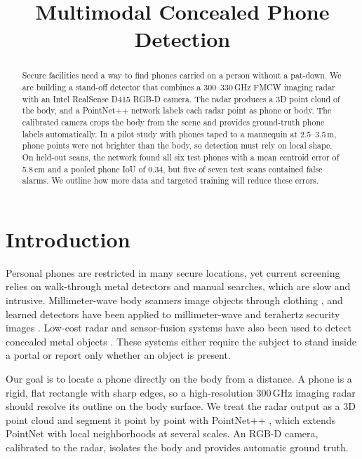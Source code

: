 \documentclass[conference]{IEEEtran}
\begin{document}
\title{Multimodal Concealed Phone Detection}

\author{
}

\maketitle

\begin{abstract}
Secure facilities need a way to find phones carried on a person without a pat-down. We are building a stand-off detector that combines a 300--330\,GHz FMCW imaging radar with an Intel RealSense D415 RGB-D camera. The radar produces a 3D point cloud of the body, and a PointNet++ network labels each radar point as phone or body. The calibrated camera crops the body from the scene and provides ground-truth phone labels automatically. In a pilot study with phones taped to a mannequin at 2.5--3.5\,m, phone points were not brighter than the body, so detection must rely on local shape. On held-out scans, the network found all six test phones with a mean centroid error of 5.8\,cm and a pooled phone IoU of 0.34, but five of seven test scans contained false alarms. We outline how more data and targeted training will reduce these errors.
\end{abstract}

\section{Introduction}
Personal phones are restricted in many secure locations, yet current screening relies on walk-through metal detectors and manual searches, which are slow and intrusive. Millimeter-wave body scanners image objects through clothing \cite{sheen2001}, and learned detectors have been applied to millimeter-wave and terahertz security images \cite{meng2020,pang2020}. Low-cost radar and sensor-fusion systems have also been used to detect concealed metal objects \cite{mitchell2023,kaul2024}. These systems either require the subject to stand inside a portal or report only whether an object is present.

Our goal is to locate a phone directly on the body from a distance. A phone is a rigid, flat rectangle with sharp edges, so a high-resolution 300\,GHz imaging radar should resolve its outline on the body surface. We treat the radar output as a 3D point cloud and segment it point by point with PointNet++ \cite{qi2017pointnetpp}, which extends PointNet \cite{qi2017pointnet} with local neighborhoods at several scales. An RGB-D camera, calibrated to the radar, isolates the body and provides automatic ground truth.
\end{document}
